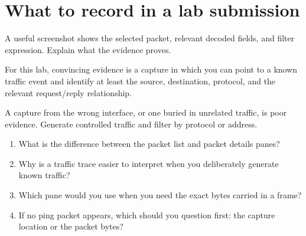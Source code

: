 \section{What to record in a lab submission}
A useful screenshot shows the selected packet, relevant decoded fields, and filter expression. Explain what the evidence proves.

\begin{verification}
For this lab, convincing evidence is a capture in which you can point to a known traffic event and identify at least the source, destination, protocol, and the relevant request/reply relationship.
\end{verification}

\begin{pitfall}
A capture from the wrong interface, or one buried in unrelated traffic, is poor evidence. Generate controlled traffic and filter by protocol or address.
\end{pitfall}

\begin{quickcheck}
\begin{enumerate}
\item What is the difference between the packet list and packet details panes?
\item Why is a traffic trace easier to interpret when you deliberately generate known traffic?
\item Which pane would you use when you need the exact bytes carried in a frame?
\item If no ping packet appears, which should you question first: the capture location or the packet bytes?
\end{enumerate}
\end{quickcheck}



